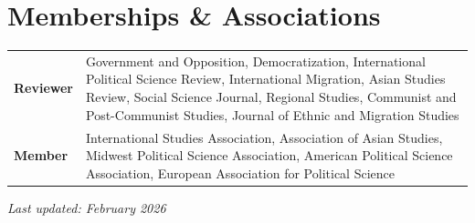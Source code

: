 \documentclass[11pt, a4paper]{article}
\begin{document}
\section{Memberships \& Associations}

\noindent\begin{tabularx}{\textwidth}{@{}p{2.4cm}X@{}}
  \textbf{Reviewer} & Government and Opposition, Democratization, International Political Science Review, International Migration, Asian Studies Review, Social Science Journal, Regional Studies, Communist and Post-Communist Studies, Journal of Ethnic and Migration Studies \\[0.5em]
  \textbf{Member} & International Studies Association, Association of Asian Studies, Midwest Political Science Association, American Political Science Association, European Association for Political Science
\end{tabularx}

\vfill

\begin{center}
  \footnotesize\textit{Last updated: February 2026}
\end{center}
\end{document}
